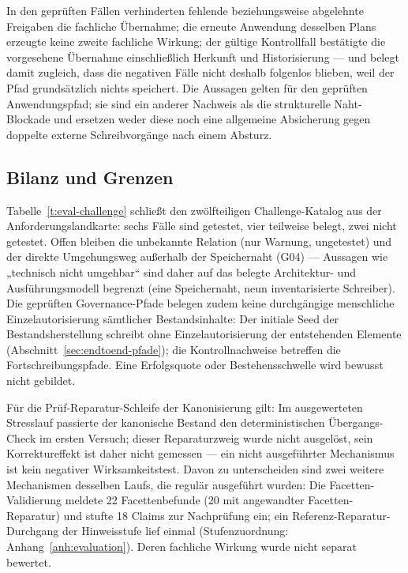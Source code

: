 

In den geprüften Fällen verhinderten fehlende beziehungsweise
abgelehnte Freigaben die fachliche Übernahme; die erneute
Anwendung desselben Plans erzeugte keine zweite fachliche Wirkung;
der gültige Kontrollfall bestätigte die vorgesehene Übernahme
einschließlich Herkunft und Historisierung --- und belegt damit
zugleich, dass die negativen Fälle nicht deshalb folgenlos
blieben, weil der Pfad grundsätzlich nichts speichert. Die
Aussagen gelten für den geprüften Anwendungspfad; sie sind ein
anderer Nachweis als die strukturelle Naht-Blockade und ersetzen
weder diese noch eine allgemeine Absicherung gegen doppelte
externe Schreibvorgänge nach einem Absturz.

\subsection{Bilanz und Grenzen}
\label{sec:eval-kontrollbilanz}

Tabelle~\ref{t:eval-challenge} schließt den zwölfteiligen
Challenge-Katalog aus der Anforderungslandkarte: sechs Fälle sind
getestet, vier teilweise belegt, zwei nicht getestet. Offen
bleiben die unbekannte Relation (nur Warnung, ungetestet) und der
direkte Umgehungsweg außerhalb der Speichernaht (G04) --- Aussagen
wie „technisch nicht umgehbar`` sind daher auf das belegte
Architektur- und Ausführungsmodell begrenzt (eine Speichernaht,
neun inventarisierte Schreiber). Die geprüften Governance-Pfade
belegen zudem keine durchgängige menschliche Einzelautorisierung
sämtlicher Bestandsinhalte: Der initiale Seed der
Bestandsherstellung schreibt ohne Einzelautorisierung der
entstehenden Elemente (Abschnitt~\ref{sec:endtoend-pfade}); die
Kontrollnachweise betreffen die Fortschreibungspfade. Eine
Erfolgsquote oder
Bestehensschwelle wird bewusst nicht gebildet.



Für die Prüf-Reparatur-Schleife der Kanonisierung gilt: Im
ausgewerteten Stresslauf passierte der kanonische Bestand den
deterministischen Übergangs-Check im ersten Versuch; dieser
Reparaturzweig wurde nicht ausgelöst, sein Korrektureffekt ist
daher nicht gemessen --- ein nicht ausgeführter Mechanismus ist
kein negativer Wirksamkeitstest. Davon zu unterscheiden sind zwei
weitere Mechanismen desselben Laufs, die regulär ausgeführt
wurden: Die Facetten-Validierung meldete 22 Facettenbefunde
(20 mit angewandter Facetten-Reparatur) und stufte 18 Claims zur
Nachprüfung ein; ein Referenz-Reparatur-Durchgang der
Hinweisstufe lief einmal (Stufenzuordnung:
Anhang~\ref{anh:evaluation}). Deren fachliche Wirkung wurde nicht
separat bewertet.

